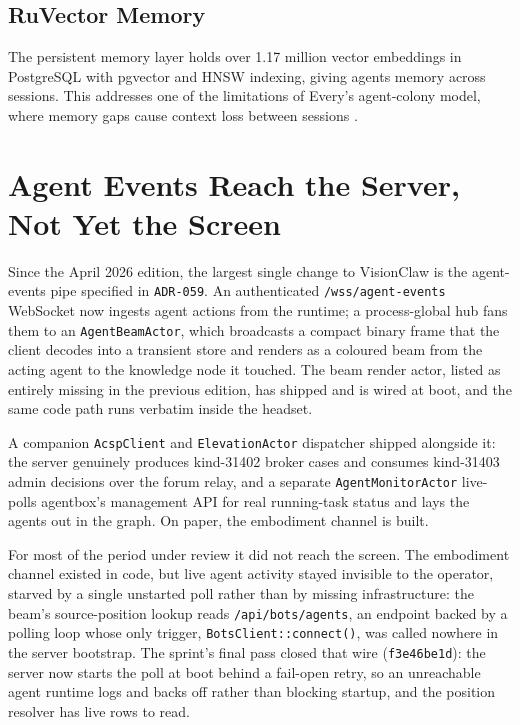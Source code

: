 \subsection{RuVector Memory}

The persistent memory layer holds over 1.17 million vector embeddings in PostgreSQL with pgvector and HNSW indexing, giving agents memory across sessions. This addresses one of the limitations of Every's agent-colony model, where memory gaps cause context loss between sessions \parencite{Shipper2026}.

\section{Agent Events Reach the Server, Not Yet the Screen}

Since the April 2026 edition, the largest single change to VisionClaw is the agent-events pipe specified in \texttt{ADR-059}. An authenticated \texttt{/wss/agent-events} WebSocket now ingests agent actions from the runtime; a process-global hub fans them to an \texttt{AgentBeamActor}, which broadcasts a compact binary frame that the client decodes into a transient store and renders as a coloured beam from the acting agent to the knowledge node it touched. The beam render actor, listed as entirely missing in the previous edition, has shipped and is wired at boot, and the same code path runs verbatim inside the headset.

A companion \texttt{AcspClient} and \texttt{ElevationActor} dispatcher shipped alongside it: the server genuinely produces kind-31402 broker cases and consumes kind-31403 admin decisions over the forum relay, and a separate \texttt{AgentMonitorActor} live-polls agentbox's management API for real running-task status and lays the agents out in the graph. On paper, the embodiment channel is built.

For most of the period under review it did not reach the screen. The embodiment channel existed in code, but live agent activity stayed invisible to the operator, starved by a single unstarted poll rather than by missing infrastructure: the beam's source-position lookup reads \texttt{/api/bots/agents}, an endpoint backed by a polling loop whose only trigger, \texttt{BotsClient::connect()}, was called nowhere in the server bootstrap. The sprint's final pass closed that wire (\texttt{f3e46be1d}): the server now starts the poll at boot behind a fail-open retry, so an unreachable agent runtime logs and backs off rather than blocking startup, and the position resolver has live rows to read.

